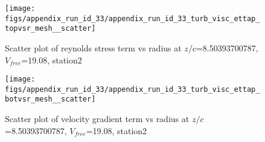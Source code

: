 \begin{figure}[H]
\centering
\texttt{[image: figs/appendix\_run\_id\_33/appendix\_run\_id\_33\_turb\_visc\_ettap\_topvsr\_mesh\_\_scatter]}
\caption{Scatter plot of reynolds stress term vs radius at $z/c$=8.50393700787, $V_{free}$=19.08, station2}
\label{fig:appendix_run_id_33_turb_visc_ettap_topvsr_mesh__scatter}
\end{figure}


\begin{figure}[H]
\centering
\texttt{[image: figs/appendix\_run\_id\_33/appendix\_run\_id\_33\_turb\_visc\_ettap\_botvsr\_mesh\_\_scatter]}
\caption{Scatter plot of velocity gradient term vs radius at $z/c$=8.50393700787, $V_{free}$=19.08, station2}
\label{fig:appendix_run_id_33_turb_visc_ettap_botvsr_mesh__scatter}
\end{figure}


